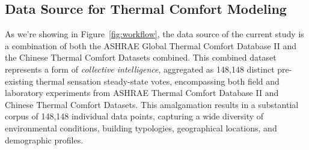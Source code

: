 



\subsection{Data Source for Thermal Comfort Modeling} \label{sec:data_foundation}

As we're showing in Figure~\ref{fig:workflow}, the data source of the current study is a combination of both the ASHRAE Global Thermal Comfort Database II and the Chinese Thermal Comfort Datasets combined. This combined dataset represents a form of \textit{collective intelligence}, aggregated as 148,148 distinct pre-existing thermal sensation steady-state votes, encompassing both field and laboratory experiments from ASHRAE Thermal Comfort Database II and Chinese Thermal Comfort Datasets. This amalgamation results in a substantial corpus of 148,148 individual data points, capturing a wide diversity of environmental conditions, building typologies, geographical locations, and demographic profiles. 

